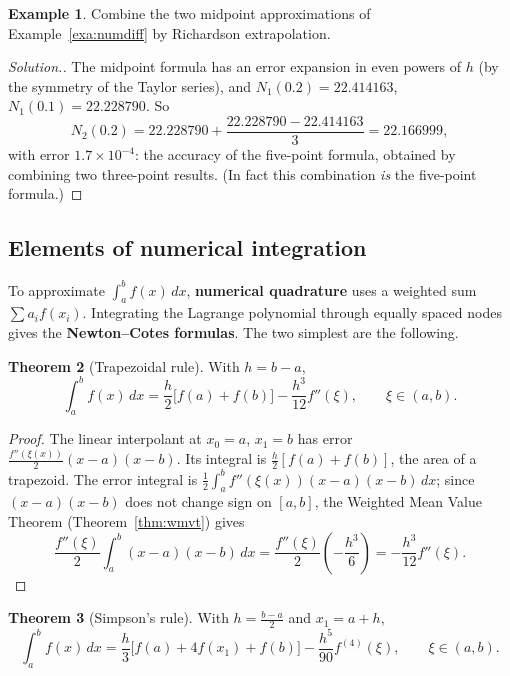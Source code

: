 \documentclass[11pt,a4paper]{article}
\numberwithin{equation}{section}
\theoremstyle{definition}
\newtheorem{thm}{Theorem}[subsection]
\newtheorem{exa}[thm]{Example}
\newenvironment{solution}
  {\renewcommand{\qedsymbol}{}\begin{proof}[\textit{Solution}.]}
  {\end{proof}}
\begin{document}
\begin{exa}
\label{exa:richardson}
Combine the two midpoint approximations of Example~\ref{exa:numdiff} by Richardson extrapolation.
\end{exa}

\begin{solution}
The midpoint formula has an error expansion in even powers of $h$ (by the symmetry of the Taylor series), and $N_1(0.2) = 22.414163$,
$N_1(0.1) = 22.228790$. So
$$N_2(0.2) = 22.228790+\frac{22.228790-22.414163}{3} = 22.166999,$$
with error $1.7\times10^{-4}$: the accuracy of the five-point formula, obtained by combining two three-point results. (In fact this
combination \emph{is} the five-point formula.)
\end{solution}


\subsection{Elements of numerical integration}
\label{sec:quad}

To approximate $\int_a^bf(x)\,dx$, \textbf{numerical quadrature} uses a weighted sum $\sum a_if(x_i)$. Integrating the Lagrange
polynomial through equally spaced nodes gives the \textbf{Newton--Cotes formulas}. The two simplest are the following.

\begin{thm}[Trapezoidal rule]
\label{thm:trap}
With $h = b-a$,
$$\int_a^bf(x)\,dx = \frac h2\bigl[f(a)+f(b)\bigr]-\frac{h^3}{12}f''(\xi),\qquad\xi\in(a,b).$$
\end{thm}

\begin{proof}
The linear interpolant at $x_0 = a$, $x_1 = b$ has error $\frac{f''(\xi(x))}{2}(x-a)(x-b)$. Its integral is $\frac h2[f(a)+f(b)]$, the area of a trapezoid.
The error integral is $\frac12\int_a^bf''(\xi(x))(x-a)(x-b)\,dx$; since $(x-a)(x-b)$ does not change sign on $[a,b]$, the Weighted Mean Value
Theorem (Theorem~\ref{thm:wmvt}) gives
$$\frac{f''(\xi)}{2}\int_a^b(x-a)(x-b)\,dx = \frac{f''(\xi)}{2}\left(-\frac{h^3}{6}\right) = -\frac{h^3}{12}f''(\xi) .$$
\end{proof}

\begin{thm}[Simpson's rule]
\label{thm:simpson}
With $h = \frac{b-a}{2}$ and $x_1 = a+h$,
$$\int_a^bf(x)\,dx = \frac h3\bigl[f(a)+4f(x_1)+f(b)\bigr]-\frac{h^5}{90}f^{(4)}(\xi),\qquad\xi\in(a,b).$$
\end{thm}
\end{document}
